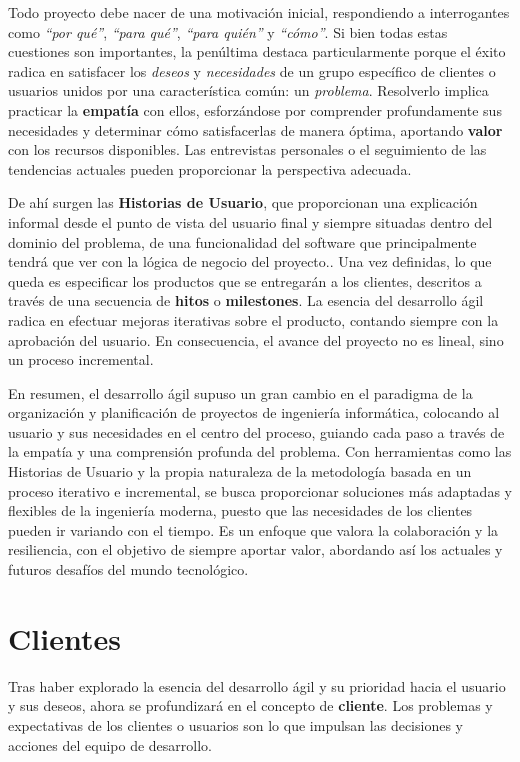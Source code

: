 Todo proyecto debe nacer de una motivación inicial, respondiendo a interrogantes como \textit{``por qué''}, \textit{``para qué''}, \textit{``para quién''} y \textit{``cómo''}. Si bien todas estas cuestiones son importantes, la penúltima destaca particularmente porque el éxito radica en satisfacer los \textit{deseos} y \textit{necesidades} de un grupo específico de clientes o usuarios unidos por una característica común: un \textit{problema}. 
Resolverlo implica practicar la \textbf{empatía} con ellos, esforzándose por comprender profundamente sus necesidades y determinar cómo satisfacerlas de manera óptima, aportando \textbf{valor} con los recursos disponibles. Las entrevistas personales o el seguimiento de las tendencias actuales pueden proporcionar la perspectiva adecuada.

De ahí surgen las \textbf{Historias de Usuario}, que proporcionan una explicación informal desde el punto de vista del usuario final y siempre situadas dentro del dominio del problema, de una funcionalidad del software que principalmente tendrá que ver con la lógica de negocio del proyecto.\cite{jj-design-thinking}. Una vez definidas, lo que queda es especificar los productos que se entregarán a los clientes, descritos a través de una secuencia de \textbf{hitos} o \textbf{milestones}. La esencia del desarrollo ágil radica en efectuar mejoras iterativas sobre el producto, contando siempre con la aprobación del usuario. En consecuencia, el avance del proyecto no es lineal, sino un proceso incremental.

En resumen, el desarrollo ágil supuso un gran cambio en el paradigma de la organización y planificación de proyectos de ingeniería informática, colocando al usuario y sus necesidades en el centro del proceso, guiando cada paso a través de la empatía y una comprensión profunda del problema. Con herramientas como las Historias de Usuario y la propia naturaleza de la metodología basada en un proceso iterativo e incremental, se busca proporcionar soluciones más adaptadas y flexibles de la ingeniería moderna, puesto que las necesidades de los clientes pueden ir variando con el tiempo. Es un enfoque que valora la colaboración y la resiliencia, con el objetivo de siempre aportar valor, abordando así los actuales y futuros desafíos del mundo tecnológico.

\section{Clientes}
Tras haber explorado la esencia del desarrollo ágil y su prioridad hacia el usuario y sus deseos, ahora se profundizará en el concepto de \textbf{cliente}. Los problemas y expectativas de los clientes o usuarios son lo que impulsan las decisiones y acciones del equipo de desarrollo. 

